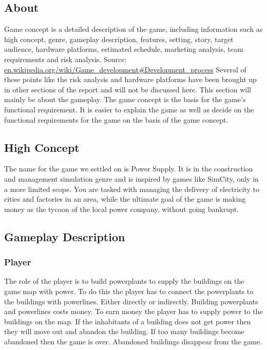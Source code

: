 \subsection{About}
Game concept is a detailed description of the game, including information such as high concept, genre,
gameplay description, features, setting, story, target audience, hardware platforms, estimated schedule,
marketing analysis, team requirements and risk analysis. Source: 
\url{en.wikipedia.org/wiki/Game_development#Development_process}
Several of these points like the risk analysis and hardware platforms have been brought up in other 
sections of the report and will not be discussed here. This section will mainly be about the gameplay. 
The game concept is the basis for the game's functional requirement. It is easier to explain the game 
as well as decide on the functional requirements for the game on the basis of the game concept. 

\subsection{High Concept}
The name for the game we settled on is Power Supply. It is in the construction and management 
simulation genre and is inspired by games like SimCity, only in a more limited scope. You are 
tasked with managing the delivery of electricity to cities and factories in an area, while the 
ultimate goal of the game is making money as the tycoon of the local power company, without going 
bankrupt.

\subsection{Gameplay Description}

\subsubsection*{Player}
The role of the player is to build powerplants to supply the buildings on the game map with power. 
To do this the player has to connect the powerplants to the buildings with powerlines. Either directly
or indirectly. Building powerplants and powerlines costs money. To earn money the player has to supply
power to the buildings on the map. If the inhabitants of a building does not get power then they will
move out and abandon the building. If too many buildings become abandoned then the game is over.
Abandoned buildings disappear from the game.

